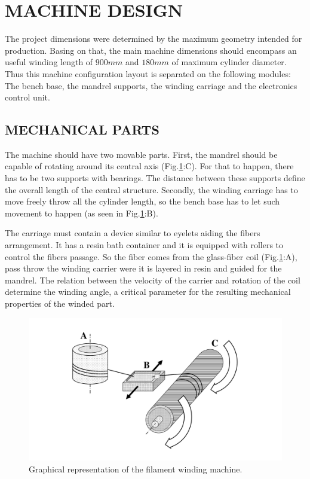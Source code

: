 \documentclass[10pt,fleqn,a4paper,twoside]{article}
\begin{document}
\section{MACHINE DESIGN}

The project dimensions were determined by the maximum geometry intended for production. Basing on that, the main machine dimensions should encompass an useful winding length of $900 mm$ and $180 mm$ of maximum cylinder diameter. Thus this machine configuration layout is separated on the following modules:  The bench base, the mandrel supports, the winding carriage and the electronics control unit.

\subsection{MECHANICAL PARTS}

The machine should have two movable parts. First, the mandrel should be capable of rotating around its central axis (Fig.\ref{i4}:C). For that to happen, there has to be two supports with bearings. The distance between these supports define the overall length of the central structure. Secondly, the winding carriage has to move freely throw all the cylinder length, so the bench base has to let such movement to happen (as seen in Fig.\ref{i4}:B).

The carriage must contain a device similar to eyelets aiding the fibers arrangement. It has a resin bath container and it is equipped with rollers to control the fibers passage. So the fiber comes from the glass-fiber coil (Fig.\ref{i4}:A), pass throw the winding carrier were it is layered in resin and guided for the mandrel. The relation between the velocity of the carrier and rotation of the coil determine the winding angle, a critical parameter for the resulting mechanical properties of the winded part. 

\begin{figure}[!h]
	\centering
	\includegraphics[angle=0, scale=0.45]{imagens/imagem1}
	\caption{Graphical representation of the filament winding machine.}
	\label{i4}
\end{figure}
\end{document}
